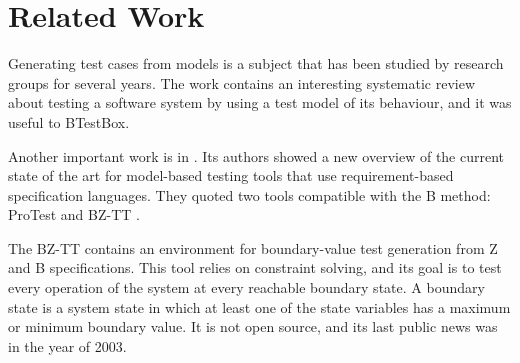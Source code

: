 \documentclass[runningheads]{llncs}
\begin{document}



\section{Related Work} \label{sec:RelatedWork}
Generating test cases from models is a subject that has been studied by research groups for several years. The work \cite{shafique2010systematic} contains an interesting systematic review about testing a software system by using a test model of its behaviour, and it was useful to BTestBox.

Another important work is in \cite{marinescu:2015}. Its authors showed a new overview of the current state of the art for model-based testing tools that use requirement-based specification languages. They quoted two tools compatible with the B method: ProTest \cite{leuschel:2005} and BZ-TT \cite{bouquet:2002}.

The BZ-TT contains an environment for boundary-value test generation from Z and B specifications. This tool relies on constraint solving, and its goal is to test every operation of the system at every reachable boundary state. A boundary state is a system state in which at least one of the state variables has a maximum or minimum boundary value. It is not open source, and its last public news was in the year of 2003.
\end{document}

